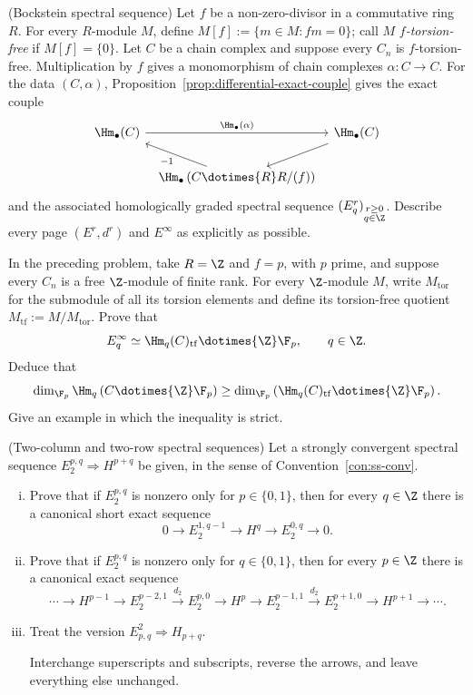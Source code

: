 \begin{Exercises}
	\item (Bockstein spectral sequence) Let $f$ be a non-zero-divisor in a
	commutative ring $R$. For every $R$-module $M$, define
	$M[f]:=\{m\in M:fm=0\}$; call $M$ \emph{$f$-torsion-free} if
	$M[f]=\{0\}$. Let $C$ be a chain complex and suppose every $C_n$ is
	$f$-torsion-free. Multiplication by $f$ gives a monomorphism of chain
	complexes $\alpha:C\to C$. For the data $(C,\alpha)$,
	Proposition~\ref{prop:differential-exact-couple} gives the exact couple
	\[\begin{tikzcd}[column sep=tiny]
		\Hm_\bullet(C) \arrow[rr, "{\Hm_\bullet(\alpha)}"] & &
		\Hm_\bullet(C) \arrow[ld] \\
		& \Hm_\bullet\left(C\dotimes{R}R/(f)\right) \arrow[lu, "{-1}"] &
	\end{tikzcd}\]
	and the associated homologically graded spectral sequence
	$(E^r_q)_{\substack{r\geq0\\q\in\Z}}$. Describe every page
	$(E^r,d^r)$ and $E^\infty$ as explicitly as possible.

	\item In the preceding problem, take $R=\Z$ and $f=p$, with $p$ prime,
	and suppose every $C_n$ is a free $\Z$-module of finite rank. For every
	$\Z$-module $M$, write $M_{\mathrm{tor}}$ for the submodule of all its
	torsion elements and define its torsion-free quotient
	$M_{\mathrm{tf}}:=M/M_{\mathrm{tor}}$. Prove that
	\[ E^\infty_q\simeq\Hm_q(C)_{\mathrm{tf}}\dotimes{\Z}\F_p,
	\qquad q\in\Z. \]
	Deduce that
	\[ \dim_{\F_p}\Hm_q\left(C\dotimes{\Z}\F_p\right)
	\geq\dim_{\F_p}\left(\Hm_q(C)_{\mathrm{tf}}\dotimes{\Z}\F_p\right). \]
	Give an example in which the inequality is strict.

	\item (Two-column and two-row spectral sequences) Let a strongly
	convergent spectral sequence $E_2^{p,q}\Rightarrow H^{p+q}$ be given, in
	the sense of Convention~\ref{con:ss-conv}.
	\begin{enumerate}[(i)]
		\item Prove that if $E_2^{p,q}$ is nonzero only for
		$p\in\{0,1\}$, then for every $q\in\Z$ there is a canonical short
		exact sequence
		\[ 0\to E_2^{1,q-1}\to H^q\to E_2^{0,q}\to0. \]
		\item Prove that if $E_2^{p,q}$ is nonzero only for
		$q\in\{0,1\}$, then for every $p\in\Z$ there is a canonical exact
		sequence
		\[ \cdots\to H^{p-1}\to E_2^{p-2,1}\xrightarrow{d_2}E_2^{p,0}
		\to H^p\to E_2^{p-1,1}\xrightarrow{d_2}E_2^{p+1,0}
		\to H^{p+1}\to\cdots. \]
		\item Treat the version $E^2_{p,q}\Rightarrow H_{p+q}$.
		\begin{hint}
			Interchange superscripts and subscripts, reverse the arrows, and
			leave everything else unchanged.
		\end{hint}
	\end{enumerate}


\end{Exercises}
